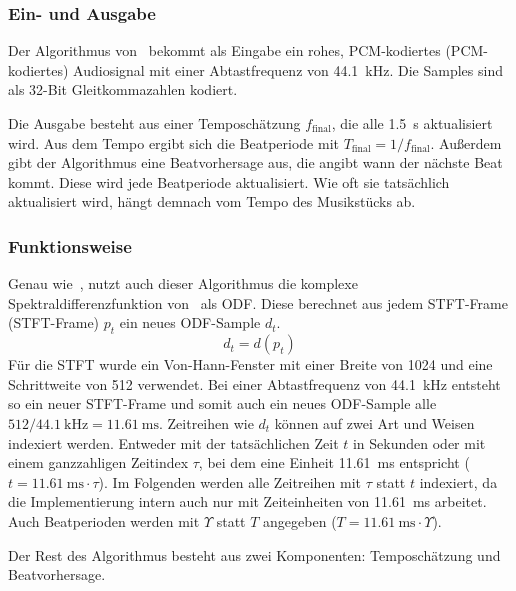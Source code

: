 {{		\subsubsection*{Ein- und Ausgabe}
		{
			Der Algorithmus von~\cite{2009_DaPlSt} bekommt als Eingabe ein rohes, \acs{PCM}-kodiertes (\acl{PCM}-kodiertes) Audiosignal mit einer Abtastfrequenz von \SI{44.1}{\kilo\hertz}.
			Die Samples sind als 32-Bit Gleitkommazahlen kodiert.

			Die Ausgabe besteht aus einer Temposchätzung $f_\text{final}$,
				die alle \SI{1.5}{\second} aktualisiert wird.
			Aus dem Tempo ergibt sich die Beatperiode mit $T_\text{final} = 1 / f_\text{final}$.
			Au{\ss}erdem gibt der Algorithmus eine Beatvorhersage aus,
				die angibt wann der nächste Beat kommt.
			Diese wird jede Beatperiode aktualisiert.
			Wie oft sie tatsächlich aktualisiert wird,
				hängt demnach vom Tempo des Musikstücks ab.
		}

		\subsubsection*{Funktionsweise}
		{
			Genau wie~\cite{2011_PlRoSt},
				nutzt auch dieser Algorithmus die komplexe Spektraldifferenzfunktion von~\cite{2004_BeDaDuSa}
				als \ac{ODF}.
			Diese berechnet aus jedem \acs{STFT}-Frame (\acl{STFT}-Frame) $p_t$ ein neues \ac{ODF}-Sample $d_t$.
			\begin{equation}
				d_t = d(p_t)
			\end{equation}
			Für die \ac{STFT} wurde ein Von-Hann-Fenster mit einer Breite von \num{1024} und eine Schrittweite von \num{512} verwendet.
			Bei einer Abtastfrequenz von \SI{44.1}{\kilo\hertz} entsteht so ein neuer \acs{STFT}-Frame
				und somit auch ein neues \ac{ODF}-Sample
				alle $512 / \SI{44.1}{\kilo\hertz} = \SI{11.61}{\milli\second}$.
			Zeitreihen wie $d_t$ können auf zwei Art und Weisen indexiert werden.
			Entweder mit der tatsächlichen Zeit $t$ in Sekunden
				oder mit einem ganzzahligen Zeitindex $\tau$,
				bei dem eine Einheit \SI{11.61}{\milli\second} entspricht
				($t = \SI{11.61}{\milli\second} \cdot \tau$).
			Im Folgenden werden alle Zeitreihen mit $\tau$ statt $t$ indexiert,
				da die Implementierung intern auch nur mit Zeiteinheiten von \SI{11.61}{\milli\second} arbeitet.
			Auch Beatperioden werden mit $\Upsilon$ statt $T$ angegeben ($T = \SI{11.61}{\milli\second} \cdot \Upsilon$).

			Der Rest des Algorithmus besteht aus zwei Komponenten:
				Temposchätzung und Beatvorhersage.

}}}
